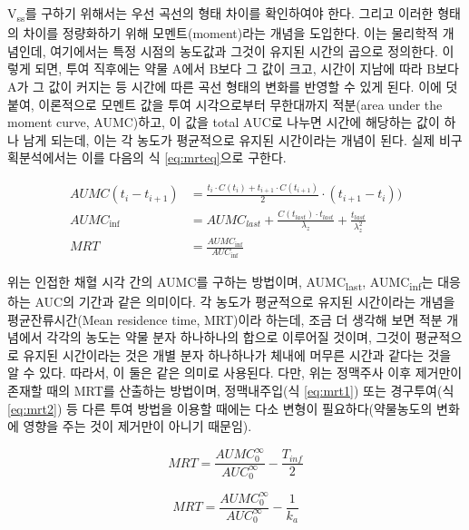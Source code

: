 \documentclass[
  11pt,
  krantz2, a4paper, twoside]{krantz}
\theoremstyle{definition}
\theoremstyle{definition}
\theoremstyle{definition}
\theoremstyle{definition}
\theoremstyle{remark}
\begin{document}

V\textsubscript{ss}를 구하기 위해서는 우선 곡선의 형태 차이를 확인하여야 한다.
그리고 이러한 형태의 차이를 정량화하기 위해 모멘트(moment)라는 개념을
도입한다. 이는 물리학적 개념인데, 여기에서는 특정 시점의 농도값과 그것이
유지된 시간의 곱으로 정의한다. 이렇게 되면, 투여 직후에는 약물 A에서
B보다 그 값이 크고, 시간이 지남에 따라 B보다 A가 그 값이 커지는 등
시간에 따른 곡선 형태의 변화를 반영할 수 있게 된다. 이에 덧붙여,
이론적으로 모멘트 값을 투여 시각으로부터 무한대까지 적분(area under the
moment curve, AUMC)하고, 이 값을 total AUC로 나누면 시간에 해당하는
값이 하나 남게 되는데, 이는 각 농도가 평균적으로 유지된 시간이라는
개념이 된다. 실제 비구획분석에서는 이를 다음의 식 \eqref{eq:mrteq}으로 구한다.

\begin{equation}
\begin{split}
  AUMC(t_i-t_{i+1}) &= \frac{t_i \cdot C(t_i) + t_{i+1} \cdot C(t_{i+1})}{2} \cdot (t_{i+1}-t_i)) \\
  AUMC_{\inf} &= AUMC_{last} + \frac{C(t_{last}) \cdot t_{last}}{\lambda_z} + \frac{t_{last}}{\lambda_z^2} \\
  MRT &= \frac{AUMC_{\inf}}{AUC_{\inf}}
\end{split}
\label{eq:mrteq}
\end{equation}

위는 인접한 채혈 시각 간의 AUMC를 구하는 방법이며, AUMC\textsubscript{last}, AUMC\textsubscript{inf}는 대응하는 AUC의 기간과 같은 의미이다.
각 농도가 평균적으로 유지된 시간이라는 개념을 평균잔류시간(Mean residence time, MRT)이라 하는데, 조금 더 생각해 보면 적분 개념에서 각각의 농도는 약물 분자 하나하나의 합으로 이루어질 것이며, 그것이 평균적으로 유지된 시간이라는 것은 개별 분자 하나하나가 체내에 머무른 시간과 같다는 것을 알 수 있다.
따라서, 이 둘은 같은 의미로 사용된다.
다만, 위는 정맥주사 이후 제거만이 존재할 때의 MRT를 산출하는 방법이며, 정맥내주입(식 \eqref{eq:mrt1}) 또는 경구투여(식 \eqref{eq:mrt2}) 등 다른 투여 방법을 이용할 때에는 다소 변형이 필요하다(약물농도의 변화에 영향을 주는 것이 제거만이 아니기 때문임).

\begin{equation}
MRT = \frac{AUMC_{0}^{\infty}}{AUC_{0}^{\infty}} - \frac{T_{inf}}{2}
\label{eq:mrt1}
\end{equation}

\begin{equation}
MRT = \frac{AUMC_{0}^{\infty}}{AUC_{0}^{\infty}} - \frac{1}{k_a}
\label{eq:mrt2}
\end{equation}
\end{document}
